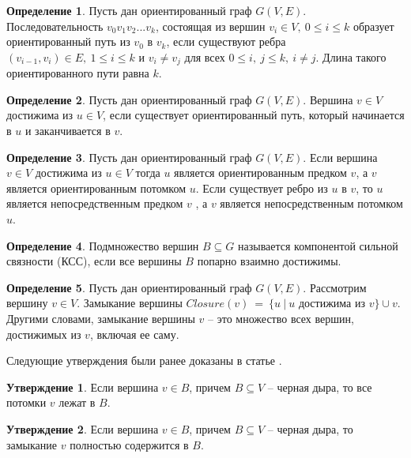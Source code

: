 \documentclass[12pt,a4paper,oneside,openany]{article}
\theoremstyle{definition}
\newtheorem{definition}{Определение}[]
\theoremstyle{lemma}
\newtheorem{lemma}{Утверждение}[]
\theoremstyle{remark}
\begin{document}
\begin{definition}\label{def:orpath}
	Пусть дан ориентированный граф $G(V,E)$. Последовательность $v_0v_1v_2...v_k$, состоящая из вершин $v_i \in V,\ 0 \leq i \leq k$ образует ориентированный путь из $v_0$ в $v_k$, если существуют ребра $(v_{i-1}, v_i) \in E,\ 1 \leq i \leq k$ и $v_i \neq v_j$ для всех $0 \leq i,\ j \leq k,\ i \neq j$. Длина такого ориентированного пути равна $k$.
\end{definition}

\begin{definition}\label{def:reachablevertex}
	Пусть дан ориентированный граф $G(V,E)$. Вершина $v \in V$ достижима из $u \in V$, если существует ориентированный путь, который начинается в $u$ и заканчивается в $v$.
\end{definition}

\begin{definition}\label{def:successor}
	Пусть дан ориентированный граф $G(V,E)$. Если вершина $v \in V$ достижима из $u \in V$ тогда $u$ является ориентированным предком $v$, а $v$ является ориентированным потомком $u$. Если существует ребро из $u$ в $v$, то $u$ является непосредственным предком $v$ , а $v$ является непосредственным потомком $u$.
\end{definition}

\begin{definition}\label{def:scc}
	Подмножество вершин $B \subseteq G$ называется компонентой сильной связности (КСС), если все вершины $B$ попарно взаимно достижимы.
\end{definition}

\begin{definition}\label{def:closure}
	Пусть дан ориентированный граф $G(V,E)$. Рассмотрим вершину $v \in V$. Замыкание вершины $Closure(v)\ =\ \{u\ |\ u$ достижима из $v\} \cup {v}$.
	Другими словами, замыкание вершины $v$ -- это множество всех вершин, достижимых из $v$, включая ее саму.
\end{definition}

Следующие утверждения были ранее доказаны в статье \cite{li2010detecting}.

\begin{lemma}
	Если вершина $v \in B$, причем $B \subseteq V$ -- черная дыра, то все потомки $v$ лежат в $B$.
\end{lemma}

\begin{lemma}
	Если вершина $v \in B$, причем $B \subseteq V$ -- черная дыра, то замыкание $v$ полностью содержится в $B$.
\end{lemma}
\end{document}
